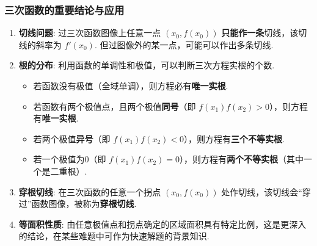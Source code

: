 \subsubsection*{三次函数的重要结论与应用}

\begin{enumerate}
	\item \textbf{切线问题}:
	过三次函数图像上任意一点 $(x_0, f(x_0))$ \textbf{只能作一条}切线，该切线的斜率为 $f'(x_0)$.
	但过图像外的某一点，可能可以作出多条切线.
	
	\item \textbf{根的分布}:
	利用函数的单调性和极值，可以判断三次方程实根的个数.
	\begin{itemize}
		\item 若函数没有极值（全域单调），则方程必有\textbf{唯一实根}.
		\item 若函数有两个极值点，且两个极值\textbf{同号}（即 $f(x_1)f(x_2)>0$），则方程有\textbf{唯一实根}.
		\item 若两个极值\textbf{异号}（即 $f(x_1)f(x_2)<0$），则方程有\textbf{三个不等实根}.
		\item 若一个极值为0（即 $f(x_1)f(x_2)=0$），则方程有\textbf{两个不等实根}（其中一个是二重根）.
	\end{itemize}
	
	\item \textbf{穿根切线}:
	在三次函数的任意一个拐点 $(x_0, f(x_0))$ 处作切线，该切线会“穿过”函数图像，被称为\textbf{穿根切线}.
	
	\item \textbf{等面积性质}:
	由任意极值点和拐点确定的区域面积具有特定比例，这是更深入的结论，在某些难题中可作为快速解题的背景知识.
\end{enumerate}